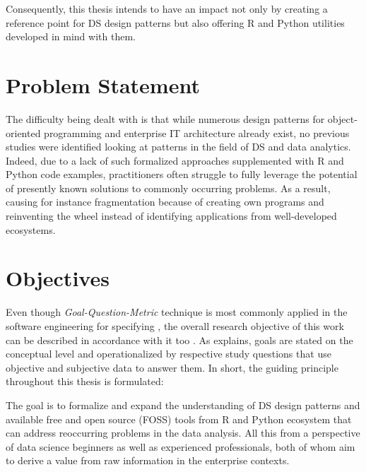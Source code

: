 Consequently, this thesis intends to have an impact not only by creating a reference point for \ac{DS} design patterns but also offering R and Python utilities developed in mind with them.

\section{Problem Statement} 
The difficulty being dealt with is that while numerous design patterns for object-oriented programming and enterprise IT architecture already exist, no previous studies were identified looking at patterns in the field of \ac{DS} and data analytics.  
Indeed, due to a lack of such formalized approaches supplemented with R and Python code examples, practitioners often struggle to fully leverage the potential of presently known solutions to commonly occurring problems.
As a result, causing for instance fragmentation because of creating own programs and reinventing the wheel instead of identifying applications from well-developed ecosystems.

\section{Objectives}
\label{objectives}
Even though \emph{Goal-Question-Metric} technique is most commonly applied in the software engineering for specifying , the overall research objective of this work can be described in accordance with it too \parencite[2]{caldiera1994goal}.
As \textcite{koziolek2008goal} explains, goals are stated on the conceptual level and operationalized by respective study questions that use objective and subjective data to answer them.
In short, the guiding principle throughout this thesis is formulated:

\begin{displayquote}
The goal is to formalize and expand the understanding of \ac{DS} design patterns and available free and open source (\ac{FOSS}) tools from R and Python ecosystem that can address reoccurring problems in the data analysis. 
All this from a perspective of data science beginners as well as experienced professionals, both of whom aim to derive a value from raw information in the enterprise contexts.
\end{displayquote}

